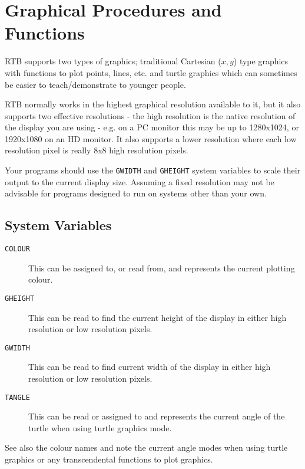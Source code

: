 \chapter{Graphical Procedures and Functions}

RTB supports two types of graphics; traditional Cartesian ($x,y$) type
graphics with functions to plot points, lines, etc. and turtle graphics
which can sometimes be easier to teach/demonstrate to younger people.

RTB normally works in the highest graphical resolution available to it,
but it also supports two effective resolutions - the high resolution
is the native resolution of the display you are using - e.g. on a PC
monitor this may be up to 1280x1024, or 1920x1080 on an HD monitor. It
also supports a lower resolution where each low resolution pixel is
really 8x8 high resolution pixels.

Your programs should use the {\tt GWIDTH} and {\tt GHEIGHT} system
variables to scale their output to the current display size. Assuming
a fixed resolution may not be advisable for programs designed to run on
systems other than your own.

\section{System Variables}
\begin{description}
\item[{\tt COLOUR}] This can be assigned to, or
read from, and represents the current plotting colour.

\item[{\tt GHEIGHT}] This can be read to find the current
height of the display in either high resolution or low resolution pixels.

\item[{\tt GWIDTH}] This can be read to find current
width of the display in either high resolution or low resolution pixels.

\item[{\tt TANGLE}] This can be read or assigned to
and represents the current angle of the turtle when using turtle
graphics mode.
\end{description}

See also the colour names and note the current angle modes when
using turtle graphics or any transcendental functions to plot
graphics.

